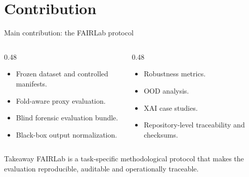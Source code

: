 \documentclass{beamer}
\begin{document}
\section{Contribution}

\begin{frame}{Main contribution: the FAIRLab protocol}

\begin{columns}

\begin{column}{0.48\textwidth}
\begin{itemize}
    \item Frozen dataset and controlled manifests.
    \item Fold-aware proxy evaluation.
    \item Blind forensic evaluation bundle.
    \item Black-box output normalization.
\end{itemize}
\end{column}

\begin{column}{0.48\textwidth}
\begin{itemize}
    \item Robustness metrics.
    \item OOD analysis.
    \item XAI case studies.
    \item Repository-level traceability and checksums.
\end{itemize}
\end{column}

\end{columns}

\begin{block}{Takeaway}
FAIRLab is a task-specific methodological protocol that makes the evaluation reproducible, auditable and operationally traceable.
\end{block}

\end{frame}

\end{document}
